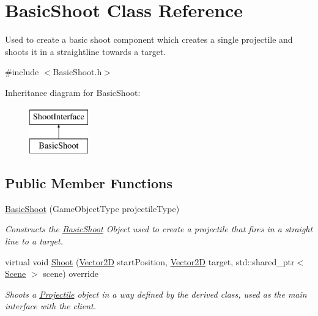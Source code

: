 \hypertarget{class_basic_shoot}{}\section{Basic\+Shoot Class Reference}
\label{class_basic_shoot}


Used to create a basic shoot component which creates a single projectile and shoots it in a straightline towards a target.  




{\ttfamily \#include $<$Basic\+Shoot.\+h$>$}

Inheritance diagram for Basic\+Shoot\+:\begin{figure}[H]
\begin{center}
\leavevmode
\includegraphics[height=2.000000cm]{d0/d31/class_basic_shoot}
\end{center}
\end{figure}
\subsection*{Public Member Functions}
\begin{DoxyCompactItemize}
\item 
\hyperlink{class_basic_shoot_a7594a4b840d698baa8d4a51027078727}{Basic\+Shoot} (Game\+Object\+Type projectile\+Type)
\begin{DoxyCompactList}\small\item\em Constructs the \hyperlink{class_basic_shoot}{Basic\+Shoot} Object used to create a projectile that fires in a straight line to a target. \end{DoxyCompactList}\item 
virtual void \hyperlink{class_basic_shoot_a8bed811408d1afa3ecf0454ae78f2303}{Shoot} (\hyperlink{class_vector2_d}{Vector2D} start\+Position, \hyperlink{class_vector2_d}{Vector2D} target, std\+::shared\+\_\+ptr$<$ \hyperlink{class_scene}{Scene} $>$ scene) override
\begin{DoxyCompactList}\small\item\em Shoots a \hyperlink{class_projectile}{Projectile} object in a way defined by the derived class, used as the main interface with the client. \end{DoxyCompactList}\end{DoxyCompactItemize}
